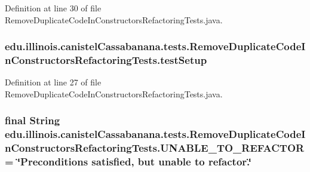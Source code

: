 Definition at line 30 of file RemoveDuplicateCodeInConstructorsRefactoringTests.java.

\hypertarget{classedu_1_1illinois_1_1canistelCassabanana_1_1tests_1_1RemoveDuplicateCodeInConstructorsRefactoringTests_a59cc4d65c71cfb08779284c46cb56d3e}{
\subsubsection[{testSetup}]{ {\bf edu.illinois.canistelCassabanana.tests.RemoveDuplicateCodeInConstructorsRefactoringTests.testSetup}}}
\label{classedu_1_1illinois_1_1canistelCassabanana_1_1tests_1_1RemoveDuplicateCodeInConstructorsRefactoringTests_a59cc4d65c71cfb08779284c46cb56d3e}


Definition at line 27 of file RemoveDuplicateCodeInConstructorsRefactoringTests.java.

\hypertarget{classedu_1_1illinois_1_1canistelCassabanana_1_1tests_1_1RemoveDuplicateCodeInConstructorsRefactoringTests_a41a2b2c573bfe5d793565302ca9637ab}{
\subsubsection[{UNABLE\_\-TO\_\-REFACTOR}]{\setlength{\rightskip}{0pt plus 5cm}final String {\bf edu.illinois.canistelCassabanana.tests.RemoveDuplicateCodeInConstructorsRefactoringTests.UNABLE\_\-TO\_\-REFACTOR} = \char`\"{}Preconditions satisfied, but unable to refactor.\char`\"{}}}
\label{classedu_1_1illinois_1_1canistelCassabanana_1_1tests_1_1RemoveDuplicateCodeInConstructorsRefactoringTests_a41a2b2c573bfe5d793565302ca9637ab}



